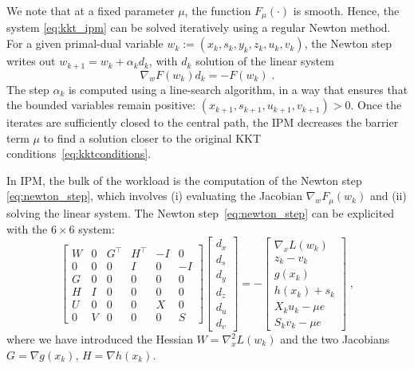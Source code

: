 We note that at a fixed parameter $\mu$, the function $F_\mu(\cdot)$
is smooth. Hence, the system \eqref{eq:kkt_ipm} can be solved iteratively
using a regular Newton method. For a given primal-dual variable
$w_k := (x_k, s_k, y_k, z_k, u_k, v_k)$, the Newton step writes out
$w_{k+1} = w_k + \alpha_k d_k$, with $d_k$ solution of the linear system
\begin{equation}
  \label{eq:newton_step}
  \nabla_w F(w_k) d_k = -F(w_k) \; .
\end{equation}
The step $\alpha_k$ is computed using a line-search algorithm, in a way
that ensures that the bounded variables remain positive: $(x_{k+1}, s_{k+1}, u_{k+1}, v_{k+1}) > 0$.
Once the iterates are sufficiently closed to the central path,
the IPM decreases the barrier term $\mu$ to find a solution closer to
the original KKT conditions~\eqref{eq:kktconditions}.

In IPM, the bulk of the workload is the computation of the Newton
step \eqref{eq:newton_step}, which involves (i) evaluating the Jacobian
$\nabla_w F_\mu(w_k)$ and (ii) solving the linear system.
The Newton step~\eqref{eq:newton_step} can be explicited with
the $6 \times 6$ system:
\begin{equation}
  \label{eq:kkt:unreduced}
  \tag{$K_3$}
  \begin{bmatrix}
    W & 0 & G^\top & H^\top & -I & 0 \\
    0 & 0 & 0 & I & 0 & -I \\
    G & 0 & 0 & 0 & 0 & 0 \\
    H & I & 0 & 0 & 0 & 0 \\
    U & 0 & 0 & 0 & X & 0 \\
    0 & V & 0 & 0 & 0 & S
  \end{bmatrix}
  \begin{bmatrix}
    d_x \\
    d_s \\
    d_y \\
    d_z \\
    d_u \\
    d_v
  \end{bmatrix}
  = - \begin{bmatrix}
    \nabla_x L(w_k) \\
       z_k - v_k  \\
       g(x_k)  \\
       h(x_k) + s_k  \\
       X_k u_k - \mu e  \\
       S_k v_k - \mu e
  \end{bmatrix} \; ,
\end{equation}
where we have introduced the Hessian $W = \nabla^2_x L(w_k)$ and
the two Jacobians $G = \nabla g(x_k)$, $H = \nabla h(x_k)$.

